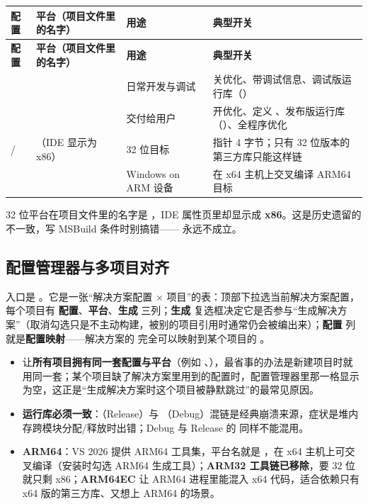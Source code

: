 {{\begin{longtable}{L{1.8cm}L{4.4cm}L{3.4cm}L{4.6cm}}
\toprule
\textbf{配置} & \textbf{平台（项目文件里的名字）} & \textbf{用途} & \textbf{典型开关} \\
\midrule
\endfirsthead
\toprule
\textbf{配置} & \textbf{平台（项目文件里的名字）} & \textbf{用途} & \textbf{典型开关} \\
\midrule
\endhead
\bottomrule
\endlastfoot
{} &  & 日常开发与调试 & 关优化、带调试信息、调试版运行库（） \\
 &  & 交付给用户 & 开优化、定义 、发布版运行库（）、全程序优化 \\
 /  & （IDE 显示为 x86） & 32 位目标 & 指针 4 字节；只有 32 位版本的第三方库只能这样链 \\
 &  & Windows on ARM 设备 & 在 x64 主机上交叉编译 ARM64 目标 \\
\end{longtable}

\begin{warnbox}[注意]
32 位平台在项目文件里的名字是 \textbf{}，IDE 属性页里却显示成 \textbf{x86}。这是历史遗留的不一致，写 MSBuild 条件时别搞错—— 永远不成立。
\end{warnbox}

\subsection{配置管理器与多项目对齐}

入口是 。它是一张“解决方案配置 × 项目”的表：顶部下拉选当前解决方案配置，每个项目有 \textbf{配置}、\textbf{平台}、\textbf{生成} 三列；\textbf{生成} 复选框决定它是否参与“生成解决方案”（取消勾选只是不主动构建，被别的项目引用时通常仍会被编出来）；\textbf{配置} 列就是\textbf{配置映射}——解决方案的  完全可以映射到某个项目的 。

\begin{itemize}
  \item 让\textbf{所有项目拥有同一套配置与平台}（例如 、），最省事的办法是新建项目时就用同一套；某个项目缺了解决方案里用到的配置时，配置管理器里那一格显示为空，这正是“生成解决方案时这个项目被静默跳过”的最常见原因。
  \item \textbf{运行库必须一致}：（Release）与 （Debug）混链是经典崩溃来源，症状是堆内存跨模块分配/释放时出错；Debug 与 Release 的  同样不能混用。
  \item \textbf{ARM64}：VS 2026 提供 ARM64 工具集，平台名就是 ，在 x64 主机上可交叉编译（安装时勾选 ARM64 生成工具）；\textbf{ARM32 工具链已移除}，要 32 位就只剩 x86；\textbf{ARM64EC} 让 ARM64 进程里能混入 x64 代码，适合依赖只有 x64 版的第三方库、又想上 ARM64 的场景。
\end{itemize}

}}
